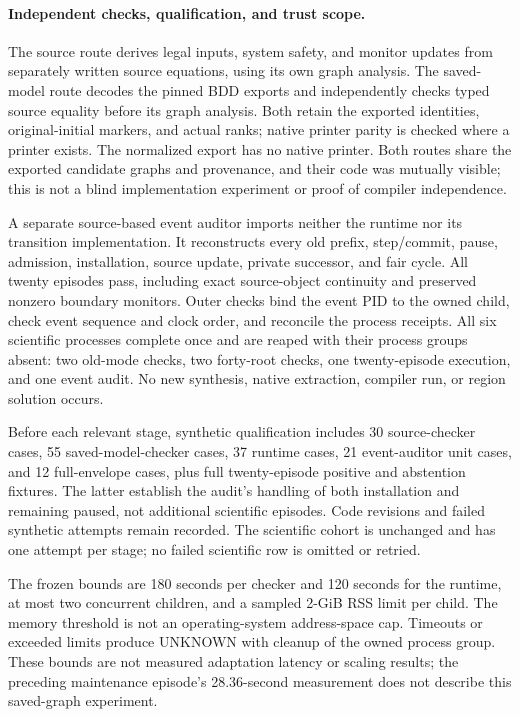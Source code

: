 \paragraph{Independent checks, qualification, and trust scope.}
The source route derives legal inputs, system safety, and monitor updates
from separately written source equations, using its own graph analysis.
The saved-model route decodes the pinned BDD exports and independently
checks typed source equality before its graph analysis. Both retain the
exported identities, original-initial markers, and actual ranks; native
printer parity is checked where a printer exists. The normalized export
has no native printer. Both routes share the exported candidate graphs
and provenance, and their code was mutually visible; this is not a blind
implementation experiment or proof of compiler independence.

A separate source-based event auditor imports neither the runtime nor
its transition implementation. It reconstructs every old prefix,
step/commit, pause, admission, installation, source update, private
successor, and fair cycle. All twenty episodes pass, including exact
source-object continuity and preserved nonzero boundary monitors. Outer
checks bind the event PID to the owned child, check event sequence and
clock order, and reconcile the process receipts. All six scientific
processes complete once and are reaped with their process groups absent:
two old-mode checks, two forty-root checks, one twenty-episode execution,
and one event audit. No new synthesis, native extraction, compiler run,
or region solution occurs.

Before each relevant stage, synthetic qualification includes 30 source-checker cases,
55 saved-model-checker cases, 37 runtime cases, 21 event-auditor unit
cases, and 12 full-envelope cases, plus full twenty-episode positive and
abstention fixtures. The latter establish the audit's handling of both
installation and remaining paused, not additional scientific episodes.
Code revisions and failed synthetic attempts remain recorded. The
scientific cohort is unchanged and has one attempt per stage; no failed
scientific row is omitted or retried.

The frozen bounds are 180 seconds per checker and 120 seconds for the
runtime, at most two concurrent children, and a sampled 2-GiB RSS limit
per child. The memory threshold is not an operating-system address-space
cap. Timeouts or exceeded limits produce UNKNOWN with cleanup of the
owned process group. These bounds are not measured adaptation latency or
scaling results; the preceding maintenance episode's 28.36-second
measurement does not describe this saved-graph experiment.

